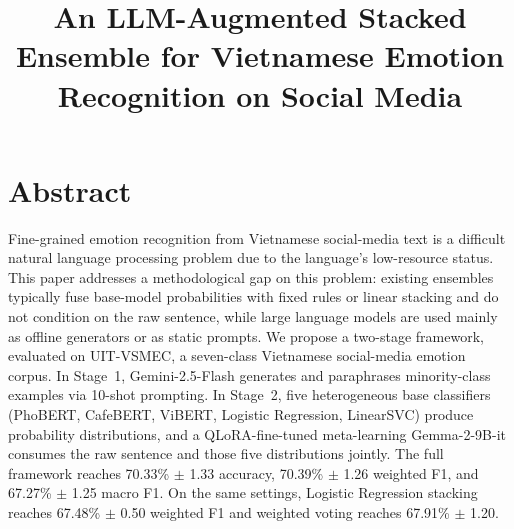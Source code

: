 \documentclass[conference]{IEEEtran}
\begin{document}
\title{An LLM-Augmented Stacked Ensemble for Vietnamese Emotion Recognition on Social Media}

\author{%
\and
{}
}
\maketitle
{}
\section*{Abstract}
Fine-grained emotion recognition from Vietnamese social-media text is a difficult natural language processing problem due to the language's low-resource status. This paper addresses a methodological gap on this problem: existing ensembles typically fuse base-model probabilities with fixed rules or linear stacking and do not condition on the raw sentence, while large language models are used mainly as offline generators or as static prompts. We propose a two-stage framework, evaluated on UIT-VSMEC, a seven-class Vietnamese social-media emotion corpus. In Stage~1, Gemini-2.5-Flash generates and paraphrases minority-class examples via 10-shot prompting. In Stage~2, five heterogeneous base classifiers (PhoBERT, CafeBERT, ViBERT, Logistic Regression, LinearSVC) produce probability distributions, and a QLoRA-fine-tuned meta-learning Gemma-2-9B-it consumes the raw sentence and those five distributions jointly. The full framework reaches 70.33\% $\pm$ 1.33 accuracy, 70.39\% $\pm$ 1.26 weighted F1, and 67.27\% $\pm$ 1.25 macro F1. On the same settings, Logistic Regression stacking reaches 67.48\% $\pm$ 0.50 weighted F1 and weighted voting reaches 67.91\% $\pm$ 1.20.
\end{document}

